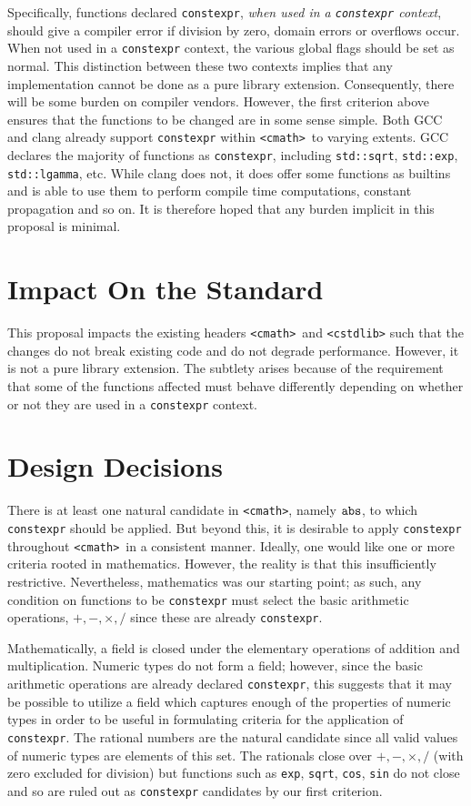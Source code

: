 \documentclass[prd,preprint,amsmath,amssymb,nofootinbib,eqsecnum]{revtex4-1}
\newcommand{\constexpr}{\code{constexpr}\xspace}
\newcommand{\code}[1]{{\tt #1}}
\newcommand{\header}[1]{{\tt <#1>}}
\newcommand{\cmath}{\header{cmath}}
\begin{document}
Specifically, functions declared \constexpr, \emph{when used in a \constexpr
context}, should give a compiler error if division by zero, domain errors or
overflows occur. When not used in a \constexpr context, the various global
flags should be set as normal. This distinction between these two contexts
implies that any implementation cannot be done as a pure library extension.
Consequently, there will be some burden on compiler vendors. However, the first
criterion above ensures that the functions to be changed are in some sense
simple. Both GCC and clang already support \constexpr within \cmath\ to varying extents. 
GCC declares the majority of functions as \constexpr, including
\code{std::sqrt}, \code{std::exp}, \code{std::lgamma}, etc.
While clang
does not, it does offer some functions as 
builtins and is able to use them to perform compile time computations, constant
propagation and so on. It is therefore hoped that any burden implicit in this
proposal is minimal.

\section{Impact On the Standard}

This proposal impacts the existing headers \cmath\ and \header{cstdlib} such
that the changes do not break existing code and do not degrade performance.
However, it is not a pure library extension. The subtlety arises because of the
requirement that some of the functions affected must behave differently
depending on whether or not they are used in a \constexpr context.

\section{Design Decisions}

There is at least one natural candidate in \header{cmath}, namely $\code{abs}$,
to which \constexpr should be applied. But beyond this, it is desirable to
apply \constexpr throughout \cmath\ in a consistent manner. Ideally, one would
like one or more criteria rooted in mathematics. However, the reality is that
this insufficiently restrictive. Nevertheless, mathematics was our starting
point; as such, any condition on functions to be \constexpr must select the
basic arithmetic operations, $+,-,\times,/$ since these are already \constexpr.

Mathematically, a field is closed under the elementary operations of addition
and multiplication.
Numeric types do not form a field; however, since the basic arithmetic
operations are already declared \constexpr, this suggests that it may be
possible to utilize a field which captures enough of the properties of numeric
types in order to be useful in formulating criteria for the application of
\constexpr. The rational numbers are the natural candidate since all valid
values of numeric types are elements of this set. The rationals close over
$+,-,\times,/$ (with zero excluded for division)
but functions such as \code{exp}, \code{sqrt}, \code{cos},
\code{sin} do not close and so are ruled out as \constexpr candidates
by our first criterion.
\end{document}
